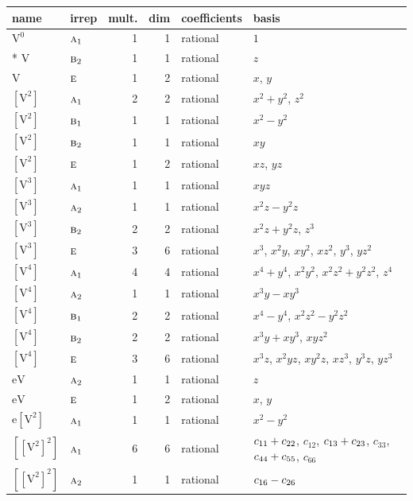 \documentclass[10pt,a4paper]{article}
\numberwithin{equation}{section}
\newcommand{\irr}[1]{\text{\normalfont\scshape #1}}
\newcommand{\jahn}[1]{\mathrm{#1}}
\newlength{\fillwidth}\newlength{\cellwidth}\newlength{\colwidth}
\newcommand{\signbreak}{\penalty100\relax}
\begin{document}
{\begin{longtable}{@{}llrrl>{\RaggedRight\arraybackslash}p{\fillwidth}@{}}
name & irrep & mult. & dim & coefficients & basis\\\midrule\endhead
\bottomrule\endfoot\endlastfoot
$\jahn{V^{0}}$ & $\irr{a}_{1}$ & 1 & 1 & rational & $1$\\*
$\jahn{V}$ & $\irr{b}_{2}$ & 1 & 1 & rational & $z$\\
$\jahn{V}$ & $\irr{e}$ & 1 & 2 & rational & $x$, $y$\\
$\jahn{[V^{2}]}$ & $\irr{a}_{1}$ & 2 & 2 & rational & $x^{2} + y^{2}$, $z^{2}$\\
$\jahn{[V^{2}]}$ & $\irr{b}_{1}$ & 1 & 1 & rational & $x^{2} - y^{2}$\\
$\jahn{[V^{2}]}$ & $\irr{b}_{2}$ & 1 & 1 & rational & $xy$\\
$\jahn{[V^{2}]}$ & $\irr{e}$ & 1 & 2 & rational & $xz$, $yz$\\
$\jahn{[V^{3}]}$ & $\irr{a}_{1}$ & 1 & 1 & rational & $xyz$\\
$\jahn{[V^{3}]}$ & $\irr{a}_{2}$ & 1 & 1 & rational & $x^{2}z - y^{2}z$\\
$\jahn{[V^{3}]}$ & $\irr{b}_{2}$ & 2 & 2 & rational & $x^{2}z + y^{2}z$, $z^{3}$\\
$\jahn{[V^{3}]}$ & $\irr{e}$ & 3 & 6 & rational & $x^{3}$, $x^{2}y$, $xy^{2}$, $xz^{2}$, $y^{3}$, $yz^{2}$\\
$\jahn{[V^{4}]}$ & $\irr{a}_{1}$ & 4 & 4 & rational & $x^{4} + y^{4}$, $x^{2}y^{2}$, $x^{2}z^{2} + y^{2}z^{2}$, $z^{4}$\\
$\jahn{[V^{4}]}$ & $\irr{a}_{2}$ & 1 & 1 & rational & $x^{3}y - xy^{3}$\\
$\jahn{[V^{4}]}$ & $\irr{b}_{1}$ & 2 & 2 & rational & $x^{4} - y^{4}$, $x^{2}z^{2} - y^{2}z^{2}$\\
$\jahn{[V^{4}]}$ & $\irr{b}_{2}$ & 2 & 2 & rational & $x^{3}y + xy^{3}$, $xyz^{2}$\\
$\jahn{[V^{4}]}$ & $\irr{e}$ & 3 & 6 & rational & $x^{3}z$, $x^{2}yz$, $xy^{2}z$, $xz^{3}$, $y^{3}z$, $yz^{3}$\\
$\jahn{eV}$ & $\irr{a}_{2}$ & 1 & 1 & rational & $z$\\
$\jahn{eV}$ & $\irr{e}$ & 1 & 2 & rational & $x$, $y$\\
$\jahn{e[V^{2}]}$ & $\irr{a}_{1}$ & 1 & 1 & rational & $x^{2} - y^{2}$\\
$\jahn{[[V^{2}]^{2}]}$ & $\irr{a}_{1}$ & 6 & 6 & rational & $c_{11} +\signbreak c_{22}$, $c_{12}$, $c_{13} +\signbreak c_{23}$, $c_{33}$, $c_{44} +\signbreak c_{55}$, $c_{66}$\\
$\jahn{[[V^{2}]^{2}]}$ & $\irr{a}_{2}$ & 1 & 1 & rational & $c_{16} -\signbreak c_{26}$\\

\end{longtable}}
\end{document}
